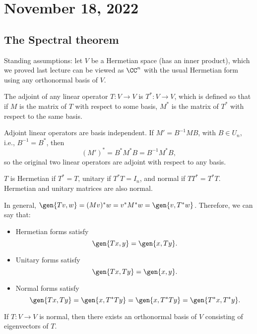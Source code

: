 \section{November 18, 2022}

\subsection{The Spectral theorem}

Standing assumptions: let $V$ be a Hermetian space (has an inner product), which we proved last lecture can be viewed as $\CC^n$ with the usual Hermetian form using any orthonormal basis of $V$. 

\begin{definition}

The \ac{adjoint} of any linear operator $T: V\rightarrow V$ is $T^*: V\rightarrow V$, which is defined so that if $M$ is the matrix of $T$ with respect to some basis, $M^*$ is the matrix of $T^*$ with respect to the same basis. 
\end{definition}

Adjoint linear operators are basis independent. If $M' = B^{-1}MB$, with $B\in U_n$, i.e., $B^{-1} = B^*$, then 
\[(M')^* = B^*M^*B = B^{-1}M^*B,\]
so the original two linear operators are adjoint with respect to any basis. 

\begin{definition}

$T$ is \ac{Hermetian} if $T^* = T$, \ac{unitary} if $T^*T = I_n$, and \ac{normal} if $TT^* = T^*T$. Hermetian and unitary matrices are also normal.
\end{definition}

In general, $\gen{Tv,w} = (Mv)^*w = v^*M^*w = \gen{v, T^*w}$. Therefore, we can say that:
\begin{itemize}
    \item Hermetian forms satisfy 
    \[\gen{Tx,y} = \gen{x, Ty}.\]
    \item Unitary forms satisfy
    \[\gen{Tx,Ty} = \gen{x, y}.\]
    \item Normal forms satisfy
    \[\gen{Tx,Ty} = \gen{x, T^*Ty} = \gen{x, T^*Ty} = \gen{T^*x, T^*y}.\]
\end{itemize}

\begin{theorem}

If $T: V\rightarrow V$ is normal, then there exists an orthonormal basis of $V$ consisting of eigenvectors of $T$. 
\end{theorem}

